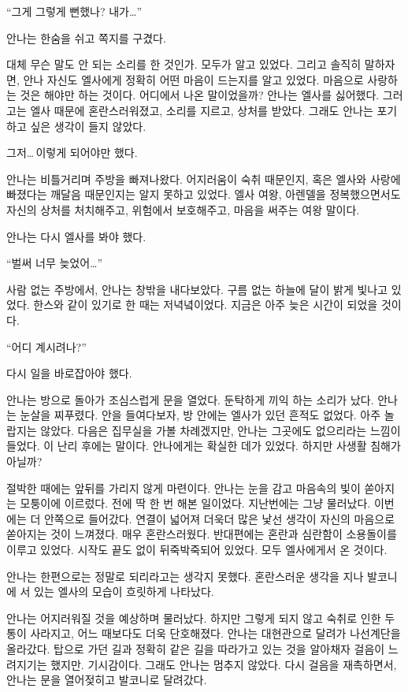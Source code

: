 ``그게 그렇게 뻔했나? 내가\ldots''

안나는 한숨을 쉬고 쪽지를 구겼다.

대체 무슨 말도 안 되는 소리를 한 것인가. 모두가 알고 있었다. 그리고 솔직히 말하자면, 안나 자신도 엘사에게 정확히 어떤 마음이 드는지를 알고 있었다. 마음으로 사랑하는 것은 해야만 하는 것이다. 어디에서 나온 말이었을까? 안나는 엘사를 싫어했다. 그러고는 엘사 때문에 혼란스러워졌고, 소리를 지르고, 상처를 받았다. 그래도 안나는 포기하고 싶은 생각이 들지 않았다.

그저\ldots\,이렇게 되어야만 했다.

안나는 비틀거리며 주방을 빠져나왔다. 어지러움이 숙취 때문인지, 혹은 엘사와 사랑에 빠졌다는 깨달음 때문인지는 알지 못하고 있었다. 엘사 여왕, 아렌델을 정복했으면서도 자신의 상처를 처치해주고, 위험에서 보호해주고, 마음을 써주는 여왕 말이다.

안나는 다시 엘사를 봐야 했다.

``벌써 너무 늦었어\ldots''

사람 없는 주방에서, 안나는 창밖을 내다보았다. 구름 없는 하늘에 달이 밝게 빛나고 있었다. 한스와 같이 있기로 한 때는 저녁녘이었다. 지금은 아주 늦은 시간이 되었을 것이다.

``어디 계시려나?''

다시 일을 바로잡아야 했다.

안나는 방으로 돌아가 조심스럽게 문을 열었다. 둔탁하게 끼익 하는 소리가 났다. 안나는 눈살을 찌푸렸다. 안을 들여다보자, 방 안에는 엘사가 있던 흔적도 없었다. 아주 놀랍지는 않았다. 다음은 집무실을 가볼 차례겠지만, 안나는 그곳에도 없으리라는 느낌이 들었다. 이 난리 후에는 말이다. 안나에게는 확실한 데가 있었다. 하지만 사생활 침해가 아닐까?

절박한 때에는 앞뒤를 가리지 않게 마련이다. 안나는 눈을 감고 마음속의 빛이 쏟아지는 모퉁이에 이르렀다. 전에 딱 한 번 해본 일이었다. 지난번에는 그냥 물러났다. 이번에는 더 안쪽으로 들어갔다. 연결이 넓어져 더욱더 많은 낯선 생각이 자신의 마음으로 쏟아지는 것이 느껴졌다. 매우 혼란스러웠다. 반대편에는 혼란과 심란함이 소용돌이를 이루고 있었다. 시작도 끝도 없이 뒤죽박죽되어 있었다. 모두 엘사에게서 온 것이다.

안나는 한편으로는 정말로 되리라고는 생각지 못했다. 혼란스러운 생각을 지나 발코니에 서 있는 엘사의 모습이 흐릿하게 나타났다.

안나는 어지러워질 것을 예상하며 물러났다. 하지만 그렇게 되지 않고 숙취로 인한 두통이 사라지고, 어느 때보다도 더욱 단호해졌다. 안나는 대현관으로 달려가 나선계단을 올라갔다. 탑으로 가던 길과 정확히 같은 길을 따라가고 있는 것을 알아채자 걸음이 느려지기는 했지만. 기시감이다. 그래도 안나는 멈추지 않았다. 다시 걸음을 재촉하면서, 안나는 문을 열어젖히고 발코니로 달려갔다.

